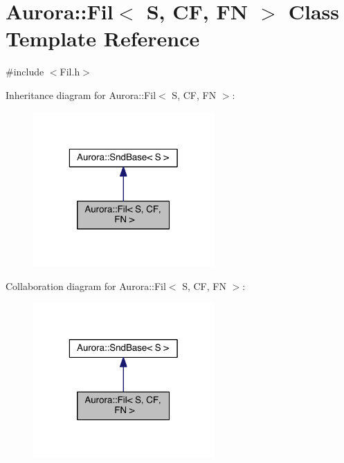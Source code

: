 \hypertarget{class_aurora_1_1_fil}{}\section{Aurora\+:\+:Fil$<$ S, CF, FN $>$ Class Template Reference}
\label{class_aurora_1_1_fil}


{\ttfamily \#include $<$Fil.\+h$>$}



Inheritance diagram for Aurora\+:\+:Fil$<$ S, CF, FN $>$\+:\nopagebreak
\begin{figure}[H]
\begin{center}
\leavevmode
\includegraphics[width=196pt]{class_aurora_1_1_fil__inherit__graph}
\end{center}
\end{figure}


Collaboration diagram for Aurora\+:\+:Fil$<$ S, CF, FN $>$\+:\nopagebreak
\begin{figure}[H]
\begin{center}
\leavevmode
\includegraphics[width=196pt]{class_aurora_1_1_fil__coll__graph}
\end{center}
\end{figure}
